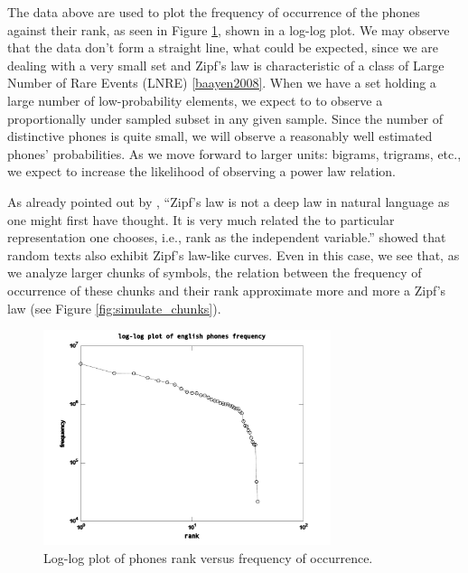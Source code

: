 The data above are used to plot the frequency of occurrence of the phones against 
their rank, as seen in Figure \ref{fig:phonesfrequency_en}, shown in a log-log plot. 
We may observe that the data don't form a straight line, 
what could be expected, since we are dealing with a very small set and Zipf's law is
characteristic of a class of Large Number of Rare Events (LNRE) \ref{baayen2008}. 
When we have a set holding a large number of low-probability elements, we expect to
to observe a proportionally under sampled subset in any given sample.
Since the number of distinctive phones is quite small, we will observe a reasonably
well estimated phones' probabilities. As we move forward to larger units: bigrams, trigrams,
etc., we expect to increase the likelihood of observing a power law relation.

As already pointed out by \cite{li1992}, ``Zipf's law is not a deep law in natural language 
as one might first have thought. It is very much related the to particular representation one 
chooses, i.e., rank as the independent variable.'' \cite{li1992} showed that random texts also 
exhibit Zipf's law-like curves. Even in this case, we see that, as we analyze larger chunks of 
symbols, the relation between the frequency of occurrence of these chunks and their rank 
approximate more and more a Zipf's law (see Figure \ref{fig:simulate_chunks}).

\begin{figure}[h!]
\centering
\includegraphics[width=0.75\textwidth]{images/phonesfrequency_en.pdf}
\caption{Log-log plot of phones rank versus frequency of occurrence.}
\label{fig:phonesfrequency_en}
\end{figure} 


